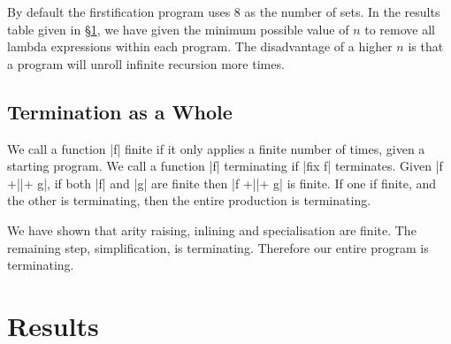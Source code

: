 \documentclass[preprint]{sigplanconf}
\begin{document}
By default the firstification program uses 8 as the number of sets. In the results table given in \S\ref{sec:results}, we have given the minimum possible value of $n$ to remove all lambda expressions within each program. The disadvantage of a higher $n$ is that a program will unroll infinite recursion more times.

\subsection{Termination as a Whole}

We call a function |f| finite if it only applies a finite number of times, given a starting program. We call a function |f| terminating if |fix f| terminates. Given |f +||+ g|, if both |f| and |g| are finite then |f +||+ g| is finite. If one if finite, and the other is terminating, then the entire production is terminating.

We have shown that arity raising, inlining and specialisation are finite. The remaining step, simplification, is terminating. Therefore our entire program is terminating.

\section{Results}
\label{sec:results}
\end{document}
